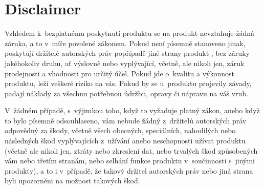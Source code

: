 \section*{Disclaimer}
{
\sc
Vzhledem k~bezplatnému poskytnutí produktu se na produkt
nevztahuje žádná záruka, a to v~míře povolené zákonem. Pokud není
písemně stanoveno jinak, poskytují držitelé autorských práv popřípadě
jiné strany produkt , bez záruky jakéhokoliv druhu, ať
výslovně nebo vyplývající, včetně, ale nikoli jen, záruk prodejnosti
a vhodnosti pro určitý účel. Pokud jde o~kvalitu a výkonnost produktu,
leží veškeré riziko na vás. Pokud by se u~produktu projevily závady,
padají náklady za všechnu potřebnou údržbu, opravy či nápravu na váš
vrub.

V~žádném případě, s~výjimkou toho, když to vyžaduje platný zákon, anebo
když to bylo písemně odsouhlaseno, vám nebude žádný z~držitelů
autorských práv odpovědný za škody,
včetně všech obecných, speciálních, nahodilých nebo následných škod
vyplývajících z~užívání anebo neschopnosti užívat produktu (včetně ale
nikoli jen, ztráty nebo zkreslení dat, nebo trvalých škod způsobených
vám nebo třetím stranám, nebo selhání funkce produktu v~součinnosti
s~jinými produkty), a to i v~případě, že takový držitel autorských práv
nebo jiná strana byli upozorněni na možnost takových škod.
}

